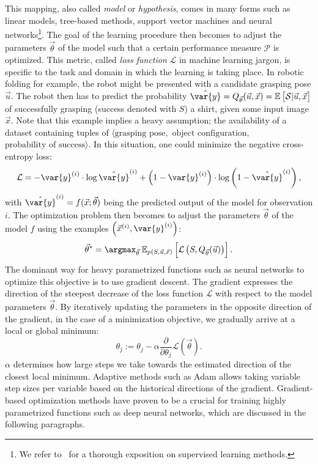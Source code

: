 \documentclass[\home/main.tex]{subfiles}
\begin{document}
This mapping, also called \textit{model} or \textit{hypothesis}, comes in many forms such as linear models, tree-based methods, support vector machines and neural networks\footnote{We refer to~\textcite{Murphy2012, Bishop2006, Hastie2001} for a thorough exposition on supervised learning methods.}.
The goal of the learning procedure then becomes to adjust the parameters $\vec{\theta}$ of the model such that a certain performance measure $\mathcal{P}$ is optimized. This metric, called \textit{loss function} $\mathcal{L}$ in machine learning jargon, is specific to the task and domain in which the learning is taking place. In robotic folding for example, the robot might be presented with a candidate grasping pose $\vec{u}$. The robot then has to predict the probability $\hat{\var{y}} = Q_{\vec{\theta}}(\vec{u}, \vec{x}) = \mathbb{E}\left[ \mathcal{S} | \vec{u}, \vec{x} \right]$ of successfully grasping (success denoted with $S$) a shirt, given some input image $\vec{x}$. Note that this example implies a heavy assumption; the availability of a dataset containing tuples of $ \langle\text{grasping pose}, $ $\text{object configuration},$ $\text{probability of success} \rangle$.
In this situation, one could minimize the negative cross-entropy loss:
\begin{equation*}
	\mathcal{L}=-\var{y}^{(i)} \cdot \log \hat{\var{y}}^{(i)} +\left(1-\var{y}^{(i)}\right) \cdot \log \left(1-\hat{\var{y}}^{(i)}\right),
\end{equation*} with $\hat{\var{y}}^{(i)} = f(\vec{x};\vec{\theta})$ being the predicted output of the model for observation $i$.
The optimization problem then becomes to adjust the parameters $\vec{\theta}$ of the model $f$ using the examples $\left(\vec{x}^{(i)}, \var{y}^{(i)}\right)$:
\begin{equation*}
	\vec{\theta}^{*}=\argmax_{\vec{\theta}} \: \mathbb{E}_{p(S, \vec{u}, \vec{x})}\left[\mathcal{L}\left(S, Q_{\vec{\theta}}(\vec{u})\right)\right].
\end{equation*}
The dominant way for heavy parametrized functions such as neural networks to optimize this objective is to use gradient descent. The gradient expresses the direction of the steepest decrease of the loss function $\mathcal{L}$ with respect to the model parameters $\vec{\theta}$. By iteratively updating the parameters in the opposite direction of the gradient, in the case of a minimization objective, we gradually arrive at a local or global minimum:
\begin{equation} \label{eq:gd_update_rule}
	\theta_{j}:=\theta_{j}-\alpha \frac{\partial}{\partial \theta_{j}} \mathcal{L}(\vec{\theta}).
\end{equation}
$\alpha$ determines how large steps we take towards the estimated direction of the closest local minimum. Adaptive methods such as Adam \autocite{Kingma2014} allows taking variable step sizes per variable based on the historical directions of the gradient. Gradient-based optimization methods have proven to be a crucial for training highly parametrized functions such as deep neural networks, which are discussed in the following paragraphs. 
\end{document}
